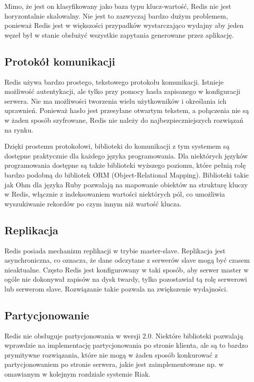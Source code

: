 Mimo, że jest on klasyfikowany jako baza typu klucz-wartość, Redis nie jest horyzontalnie skalowalny.
Nie jest to zazwyczaj bardzo dużym problemem, ponieważ Redis jest w większości przypadków wystarczająco wydajny aby jeden węzeł był w stanie obsłużyć wszystkie zapytania generowane przez aplikację.

\subsection*{Protokół komunikacji}

Redis używa bardzo prostego, tekstowego protokołu komunikacji.
Istnieje możliwość autentykacji, ale tylko przy pomocy hasła zapisanego w konfiguracji serwera.
Nie ma możliwości tworzenia wielu użytkowników i określania ich uprawnień.
Ponieważ hasło jest przesyłane otwartym tekstem, a połączenia nie są w żaden sposób szyfrowane, Redis nie należy do najbezpieczniejszych rozwiązań na rynku.

Dzięki prostemu protokołowi, biblioteki do komunikacji z tym systemem są dostępne praktycznie dla każdego języka programowania.
Dla niektórych języków programowania dostępne są także biblioteki wyższego poziomu, które pełnią rolę bardzo podobną do bibliotek ORM (Object-Relational Mapping).
Biblioteki takie jak Ohm dla języka Ruby pozwalają na mapowanie obiektów na strukturę kluczy w Redis, włącznie z indeksowaniem wartości niektórych pól, co umożliwia wyszukiwanie rekordów po czym innym niż wartość klucza. 

\subsection*{Replikacja}

Redis posiada mechanizm replikacji w trybie master-slave.
Replikacja jest asynchroniczna, co oznacza, że dane odczytane z serwerów slave mogą być czasem nieaktualne.
Często Redis jest konfigurowany w taki sposób, aby serwer master w ogóle nie dokonywał zapisów na dysk twardy, tylko pozostawiał tą rolę serwerowi lub serwerom slave.
Rozwiązanie takie pozwala na zwiększenie wydajności.

\subsection*{Partycjonowanie}

Redis nie obsługuje partycjonowania w wersji 2.0.
Niektóre biblioteki pozwalają wprawdzie na implementację partycjonowania po stronie klienta, ale są to bardzo prymitywne rozwiązania, które nie mogą w żaden sposób konkurować z partycjonowaniem po stronie serwera, jakie jest zaimplementowane np. w omawianym w kolejnym rozdziale systemie Riak.

